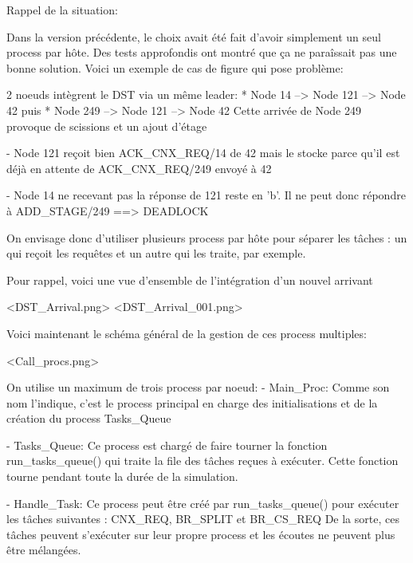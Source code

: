 Rappel de la situation:

Dans la version précédente, le choix avait été fait d'avoir simplement un seul
process par hôte. Des tests approfondis ont montré que ça ne paraîssait pas une
bonne solution. Voici un exemple de cas de figure qui pose problème:

2 noeuds intègrent le DST via un même leader:
 * Node 14 --> Node 121 --> Node 42
   puis
 * Node 249 --> Node 121 --> Node 42
   Cette arrivée de Node 249 provoque de scissions et un ajout d'étage

 - Node 121 reçoit bien ACK_CNX_REQ/14 de 42 mais le stocke parce qu'il est
   déjà en attente de ACK_CNX_REQ/249 envoyé à 42

 - Node 14 ne recevant pas la réponse de 121 reste en 'b'. Il ne peut donc
   répondre à ADD_STAGE/249 ==> DEADLOCK

On envisage donc d'utiliser plusieurs process par hôte pour séparer les tâches :
un qui reçoit les requêtes et un autre qui les traite, par exemple.

Pour rappel, voici une vue d'ensemble de l'intégration d'un nouvel arrivant

<DST_Arrival.png>
<DST_Arrival_001.png>

Voici maintenant le schéma général de la gestion de ces process multiples:

<Call_procs.png>

On utilise un maximum de trois process par noeud:
    - Main_Proc:
      Comme son nom l'indique, c'est le process principal en charge des
      initialisations et de la création du process Tasks_Queue

    - Tasks_Queue:
      Ce process est chargé de faire tourner la fonction run_tasks_queue() qui
      traite la file des tâches reçues à exécuter. Cette fonction tourne pendant
      toute la durée de la simulation.

    - Handle_Task:
      Ce process peut être créé par run_tasks_queue() pour exécuter les tâches
      suivantes : CNX_REQ, BR_SPLIT et BR_CS_REQ
      De la sorte, ces tâches peuvent s'exécuter sur leur propre process et les
      écoutes ne peuvent plus être mélangées.
